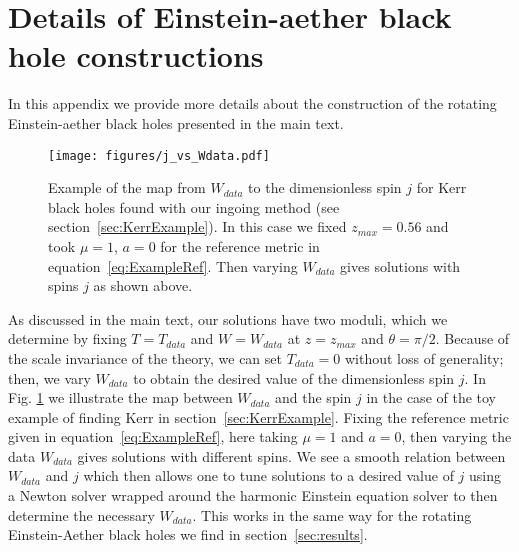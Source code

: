 \documentclass[12pt]{article}
\numberwithin{equation}{section}
\begin{document}
\section{Details of Einstein-aether black hole constructions}
\label{app:details}

In this appendix we provide more details about the construction of the rotating Einstein-aether black holes presented in the main text. 


\begin{figure}
\centering
  \texttt{[image: figures/j\_vs\_Wdata.pdf]}
  \caption{\label{fig:Wmap}
  Example of the map from $W_{data}$ to the dimensionless spin $j$ for Kerr black holes found with our ingoing method (see section~\ref{sec:KerrExample}). In this case we fixed $z_{max}=0.56$
  and took $\mu = 1$, $a = 0$ for the reference metric in equation~\eqref{eq:ExampleRef}. Then varying $W_{data}$ gives solutions with spins $j$ as shown above.
  }
\end{figure}
%


As discussed in the main text, our solutions have two moduli, which we determine by fixing $T=T_{data}$ and $W=W_{data}$ at $z=z_{max}$ and $\theta=\pi/2$. Because of the scale invariance of the theory, we can set $T_{data}=0$ without loss of generality; then, we vary $W_{data}$ to obtain the desired value of the dimensionless spin $j$. In Fig. \ref{fig:Wmap} we illustrate the map between $W_{data}$ and
the spin $j$ in the case of the toy example of finding Kerr in section~\ref{sec:KerrExample}. Fixing the reference metric given in equation~\eqref{eq:ExampleRef}, here taking $\mu = 1$ and $a = 0$, then varying the data $W_{data}$ gives solutions with different spins. We see a smooth relation between $W_{data}$ and $j$ which then allows one to tune solutions to a desired value of $j$ using a Newton solver wrapped around the harmonic Einstein equation solver to then determine the necessary $W_{data}$. This works in the same way for the rotating Einstein-Aether black holes we find in section~\ref{sec:results}.
\end{document}

